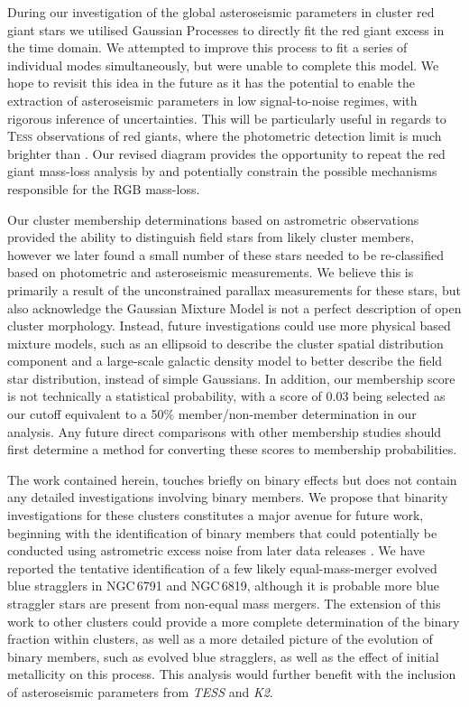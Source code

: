 During our investigation of the global asteroseismic parameters in cluster red giant stars we utilised Gaussian Processes to directly fit the red giant excess in the time domain. We attempted to improve this process to fit a series of individual modes simultaneously, but were unable to complete this model. We hope to revisit this idea in the future as it has the potential to enable the extraction of asteroseismic parameters in low signal-to-noise regimes, with rigorous inference of uncertainties. This will be particularly useful in regards to \textsc{Tess} observations of red giants, where the photometric detection limit is much brighter than \Kepler{}. Our revised \numax{} \textendash \dnu{}  diagram provides the opportunity to repeat the red giant mass-loss analysis by \citet{miglio_asteroseismology_2012} and potentially constrain the possible mechanisms responsible for the RGB mass-loss.

Our cluster membership determinations based on \Gaia{} astrometric observations provided the ability to distinguish field stars from likely cluster members, however we later found a small number of these stars needed to be re-classified based on photometric and asteroseismic measurements. We believe this is primarily a result of the unconstrained parallax measurements for these stars, but also acknowledge the Gaussian Mixture Model is not a perfect description of open cluster morphology. Instead, future investigations could use more physical based mixture models, such as an ellipsoid to describe the cluster spatial distribution component \citep{kuhn_mixture_2017} and a large-scale galactic density model to better describe the field star distribution, instead of simple Gaussians. In addition, our membership score is not technically a statistical probability, with a score of 0.03 being selected as our cutoff equivalent to a 50\% member/non-member determination in our analysis. Any future direct comparisons with other membership studies should first determine a method for converting these scores to membership probabilities.

The work contained herein, touches briefly on binary effects but does not contain any detailed investigations involving binary members. We propose that binarity investigations for these clusters constitutes a major avenue for future work, beginning with the identification of binary members that could potentially be conducted using astrometric excess noise from later \Gaia{} data releases \citep{gandhi_astrometric_2020}. We have reported the tentative identification of a few likely equal-mass-merger evolved blue stragglers in NGC\,6791 and NGC\,6819, although it is probable more blue straggler stars are present from non-equal mass mergers. The extension of this work to other clusters could provide a more complete determination of the binary fraction within clusters, as well as a more detailed picture of the evolution of binary members, such as evolved blue stragglers, as well as the effect of initial metallicity on this process. This analysis would further benefit with the inclusion of asteroseismic parameters from \textit{TESS} and \textit{K2}. 

